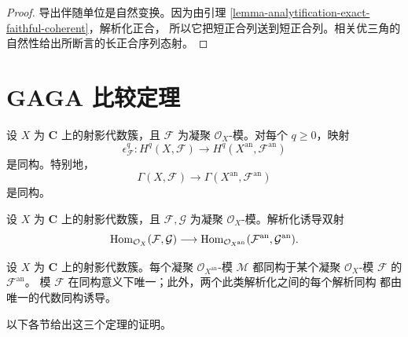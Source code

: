\begin{proof}
导出伴随单位是自然变换。因为由引理
\ref{lemma-analytification-exact-faithful-coherent}，解析化正合，
所以它把短正合列送到短正合列。相关优三角的自然性给出所断言的长正合序列态射。
\end{proof}


\section{GAGA 比较定理}
\label{section-gaga-statements}

\begin{theorem}[上同调比较]
\label{theorem-gaga-cohomology}
\begin{reference}
\cite[\S 3，第 12 号，定理 1]{GAGA}
\end{reference}
设 $X$ 为 $\mathbf C$ 上的射影代数簇，且 $\mathcal F$ 为凝聚
$\mathcal O_X$-模。对每个 $q\geq0$，映射
$$
\epsilon^q_{\mathcal F}:H^q(X,\mathcal F)
\longrightarrow H^q(X^{\mathrm{an}},\mathcal F^{\mathrm{an}})
$$
是同构。特别地，
$$
\Gamma(X,\mathcal F)\longrightarrow
\Gamma(X^{\mathrm{an}},\mathcal F^{\mathrm{an}})
$$
是同构。
\end{theorem}

\begin{theorem}[全忠实性]
\label{theorem-gaga-fully-faithful}
\begin{reference}
\cite[\S 3，第 12 号，定理 2]{GAGA}
\end{reference}
设 $X$ 为 $\mathbf C$ 上的射影代数簇，且 $\mathcal F,\mathcal G$
为凝聚 $\mathcal O_X$-模。解析化诱导双射
$$
\mathop{\rm Hom}\nolimits_{\mathcal O_X}(\mathcal F,\mathcal G)
\longrightarrow
\mathop{\rm Hom}\nolimits_{\mathcal O_{X^{\mathrm{an}}}}
(\mathcal F^{\mathrm{an}},\mathcal G^{\mathrm{an}}).
$$
\end{theorem}

\begin{theorem}[本质满性]
\label{theorem-gaga-essential-surjectivity}
\begin{reference}
\cite[\S 3，第 12 号，定理 3]{GAGA}
\end{reference}
设 $X$ 为 $\mathbf C$ 上的射影代数簇。每个凝聚
$\mathcal O_{X^{\mathrm{an}}}$-模 $\mathcal M$ 都同构于某个凝聚
$\mathcal O_X$-模 $\mathcal F$ 的 $\mathcal F^{\mathrm{an}}$。
模 $\mathcal F$ 在同构意义下唯一；此外，两个此类解析化之间的每个解析同构
都由唯一的代数同构诱导。
\end{theorem}

以下各节给出这三个定理的证明。

